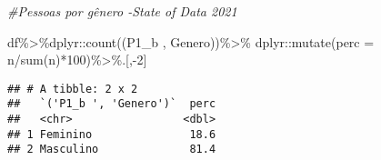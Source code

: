 \documentclass[
]{article}
\newenvironment{Shaded}{\begin{snugshade}}{\end{snugshade}}
\newcommand{\AttributeTok}[1]{\textcolor[rgb]{0.77,0.63,0.00}{#1}}
\newcommand{\CommentTok}[1]{\textcolor[rgb]{0.56,0.35,0.01}{\textit{#1}}}
\newcommand{\DecValTok}[1]{\textcolor[rgb]{0.00,0.00,0.81}{#1}}
\newcommand{\FunctionTok}[1]{\textcolor[rgb]{0.00,0.00,0.00}{#1}}
\newcommand{\NormalTok}[1]{#1}
\newcommand{\SpecialCharTok}[1]{\textcolor[rgb]{0.00,0.00,0.00}{#1}}
\newcommand{\StringTok}[1]{\textcolor[rgb]{0.31,0.60,0.02}{#1}}
\begin{document}
\begin{Shaded}
\begin{Highlighting}[]
\CommentTok{\#Pessoas por gênero {-}State of Data 2021}

\NormalTok{df}\SpecialCharTok{\%\textgreater{}\%}\NormalTok{dplyr}\SpecialCharTok{::}\FunctionTok{count}\NormalTok{(}\StringTok{\textasciigrave{}}\AttributeTok{(\textquotesingle{}P1\_b \textquotesingle{}, \textquotesingle{}Genero\textquotesingle{})}\StringTok{\textasciigrave{}}\NormalTok{)}\SpecialCharTok{\%\textgreater{}\%}
\NormalTok{  dplyr}\SpecialCharTok{::}\FunctionTok{mutate}\NormalTok{(}\AttributeTok{perc =}\NormalTok{ n}\SpecialCharTok{/}\FunctionTok{sum}\NormalTok{(n)}\SpecialCharTok{*}\DecValTok{100}\NormalTok{)}\SpecialCharTok{\%\textgreater{}\%}\NormalTok{.[,}\SpecialCharTok{{-}}\DecValTok{2}\NormalTok{]}
\end{Highlighting}
\end{Shaded}

\begin{verbatim}
## # A tibble: 2 x 2
##   `('P1_b ', 'Genero')`  perc
##   <chr>                 <dbl>
## 1 Feminino               18.6
## 2 Masculino              81.4
\end{verbatim}
\end{document}
